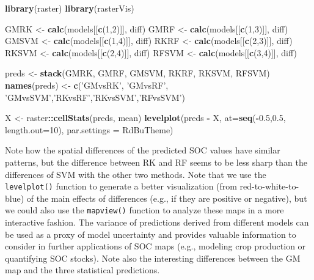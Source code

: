 \documentclass[10pt,b5paper,]{book}
\newenvironment{Shaded}{\begin{snugshade}}{\end{snugshade}}
\newcommand{\DataTypeTok}[1]{\textcolor[rgb]{0.13,0.29,0.53}{#1}}
\newcommand{\DecValTok}[1]{\textcolor[rgb]{0.00,0.00,0.81}{#1}}
\newcommand{\FloatTok}[1]{\textcolor[rgb]{0.00,0.00,0.81}{#1}}
\newcommand{\KeywordTok}[1]{\textcolor[rgb]{0.13,0.29,0.53}{\textbf{#1}}}
\newcommand{\NormalTok}[1]{#1}
\newcommand{\OperatorTok}[1]{\textcolor[rgb]{0.81,0.36,0.00}{\textbf{#1}}}
\newcommand{\StringTok}[1]{\textcolor[rgb]{0.31,0.60,0.02}{#1}}
\theoremstyle{definition}
\theoremstyle{definition}
\theoremstyle{definition}
\theoremstyle{remark}
\begin{document}
\begin{Shaded}
\begin{Highlighting}[]
\KeywordTok{library}\NormalTok{(raster)}
\KeywordTok{library}\NormalTok{(rasterVis)}

\NormalTok{GMRK  <-}\StringTok{ }\KeywordTok{calc}\NormalTok{(models[[}\KeywordTok{c}\NormalTok{(}\DecValTok{1}\NormalTok{,}\DecValTok{2}\NormalTok{)]], diff)}
\NormalTok{GMRF  <-}\StringTok{ }\KeywordTok{calc}\NormalTok{(models[[}\KeywordTok{c}\NormalTok{(}\DecValTok{1}\NormalTok{,}\DecValTok{3}\NormalTok{)]], diff)}
\NormalTok{GMSVM <-}\StringTok{ }\KeywordTok{calc}\NormalTok{(models[[}\KeywordTok{c}\NormalTok{(}\DecValTok{1}\NormalTok{,}\DecValTok{4}\NormalTok{)]], diff)}
\NormalTok{RKRF  <-}\StringTok{ }\KeywordTok{calc}\NormalTok{(models[[}\KeywordTok{c}\NormalTok{(}\DecValTok{2}\NormalTok{,}\DecValTok{3}\NormalTok{)]], diff)}
\NormalTok{RKSVM <-}\StringTok{ }\KeywordTok{calc}\NormalTok{(models[[}\KeywordTok{c}\NormalTok{(}\DecValTok{2}\NormalTok{,}\DecValTok{4}\NormalTok{)]], diff)}
\NormalTok{RFSVM <-}\StringTok{ }\KeywordTok{calc}\NormalTok{(models[[}\KeywordTok{c}\NormalTok{(}\DecValTok{3}\NormalTok{,}\DecValTok{4}\NormalTok{)]], diff)}

\NormalTok{preds <-}\StringTok{ }\KeywordTok{stack}\NormalTok{(GMRK, GMRF, GMSVM, RKRF, RKSVM, RFSVM)}
\KeywordTok{names}\NormalTok{(preds) <-}\StringTok{ }\KeywordTok{c}\NormalTok{(}\StringTok{'GMvsRK'}\NormalTok{, }\StringTok{'GMvsRF'}\NormalTok{, }\StringTok{'GMvsSVM'}\NormalTok{,}\StringTok{'RKvsRF'}\NormalTok{,}\StringTok{'RKvsSVM'}\NormalTok{,}\StringTok{'RFvsSVM'}\NormalTok{)}

\NormalTok{X <-}\StringTok{ }\NormalTok{raster}\OperatorTok{::}\KeywordTok{cellStats}\NormalTok{(preds, mean)}
\KeywordTok{levelplot}\NormalTok{(preds }\OperatorTok{-}\StringTok{ }\NormalTok{X, }\DataTypeTok{at=}\KeywordTok{seq}\NormalTok{(}\OperatorTok{-}\FloatTok{0.5}\NormalTok{,}\FloatTok{0.5}\NormalTok{, }\DataTypeTok{length.out=}\DecValTok{10}\NormalTok{),}
          \DataTypeTok{par.settings =}\NormalTok{ RdBuTheme)}
\end{Highlighting}
\end{Shaded}

Note how the spatial differences of the predicted SOC values have
similar patterns, but the difference between RK and RF seems to be less
sharp than the differences of SVM with the other two methods. Note that
we use the \texttt{levelplot()} function to generate a better
visualization (from red-to-white-to-blue) of the main effects of
differences (e.g., if they are positive or negative), but we could also
use the \texttt{mapview()} function to analyze these maps in a more
interactive fashion. The variance of predictions derived from different
models can be used as a proxy of model uncertainty and provides valuable
information to consider in further applications of SOC maps (e.g.,
modeling crop production or quantifying SOC stocks). Note also the
interesting differences between the GM map and the three statistical
predictions.
\end{document}
